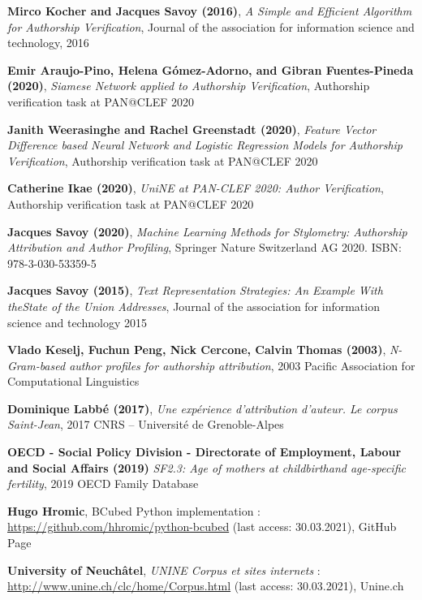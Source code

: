 \begin{thebibliography}{9}
\textbf{Mirco Kocher and Jacques Savoy (2016)},
\textit{A Simple and Efficient Algorithm for Authorship Verification},
Journal of the association for information science and technology, 2016

\textbf{Emir Araujo-Pino, Helena Gómez-Adorno, and Gibran Fuentes-Pineda (2020)},
\textit{Siamese Network applied to Authorship Verification},
Authorship verification task at PAN@CLEF 2020

\textbf{Janith Weerasinghe and Rachel Greenstadt (2020)},
\textit{Feature Vector Difference based Neural Network and Logistic Regression Models for Authorship Verification},
Authorship verification task at PAN@CLEF 2020

\textbf{Catherine Ikae (2020)},
\textit{UniNE at PAN-CLEF 2020: Author Verification},
Authorship verification task at PAN@CLEF 2020

\textbf{Jacques Savoy (2020)},
\textit{Machine Learning Methods for Stylometry: Authorship Attribution and Author Profiling},
Springer Nature Switzerland AG 2020. ISBN: 978-3-030-53359-5

\textbf{Jacques Savoy (2015)},
\textit{Text Representation Strategies: An Example With theState of the Union Addresses},
Journal of the association for information science and technology 2015

\textbf{Vlado Keselj, Fuchun Peng, Nick Cercone, Calvin Thomas (2003)},
\textit{N-Gram-based author profiles for authorship attribution},
2003 Pacific Association for Computational Linguistics

\textbf{Dominique Labbé (2017)},
\textit{Une expérience d’attribution d’auteur. Le corpus Saint-Jean},
2017 CNRS – Université de Grenoble-Alpes

\textbf{OECD - Social Policy Division - Directorate of Employment, Labour and Social Affairs (2019)}
\textit{SF2.3: Age of mothers at childbirthand age-specific fertility},
2019 OECD Family Database


\textbf{Hugo Hromic},
BCubed Python implementation : \url{https://github.com/hhromic/python-bcubed} (last access: 30.03.2021),
GitHub Page

\textbf{University of Neuchâtel},
\textit{UNINE Corpus et sites internets} : \url{http://www.unine.ch/clc/home/Corpus.html} (last access: 30.03.2021),
Unine.ch


\end{thebibliography}
